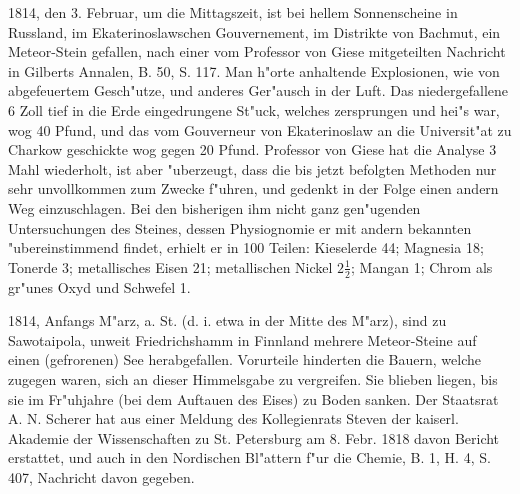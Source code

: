 \documentclass[a4paper, 11pt, oneside, polutonikogreek, german]{article}
\begin{document}
1814, den 3. Februar, um die Mittagszeit, ist bei hellem Sonnenscheine in Russland, im Ekaterinoslawschen Gouvernement, im Distrikte von Bachmut, ein Meteor-Stein gefallen, nach einer vom Professor von Giese mitgeteilten Nachricht in Gilberts Annalen, B. 50, S. 117. Man h"orte anhaltende Explosionen, wie von abgefeuertem Gesch"utze, und anderes Ger"ausch in der Luft. Das niedergefallene 6 Zoll tief in die Erde eingedrungene St"uck, welches zersprungen und hei"s war, wog 40 Pfund, und das vom Gouverneur von Ekaterinoslaw an die Universit"at zu Charkow geschickte wog gegen 20 Pfund. Professor von Giese hat die Analyse 3 Mahl wiederholt, ist aber "uberzeugt, dass die bis jetzt befolgten Methoden nur sehr unvollkommen zum Zwecke f"uhren, und gedenkt in der Folge einen andern Weg einzuschlagen. Bei den bisherigen ihm nicht ganz gen"ugenden Untersuchungen des Steines, dessen Physiognomie er mit andern bekannten "ubereinstimmend findet, erhielt er in 100 Teilen: Kieselerde 44; Magnesia 18; Tonerde 3; metallisches Eisen 21; metallischen Nickel $\mathfrak{2\frac{1}{2}}$; Mangan 1; Chrom als gr"unes Oxyd und Schwefel 1.

1814, Anfangs M"arz, a. St. (d. i. etwa in der Mitte des M"arz), sind zu Sawotaipola, unweit Friedrichshamm in Finnland mehrere Meteor-Steine auf einen (gefrorenen) See herabgefallen. Vorurteile hinderten die Bauern, welche zugegen waren, sich an dieser Himmelsgabe zu vergreifen. Sie blieben liegen, bis sie im Fr"uhjahre (bei dem Auftauen des Eises) zu Boden sanken. Der Staatsrat A. N. Scherer hat aus einer Meldung des Kollegienrats Steven der kaiserl. Akademie der Wissenschaften zu St. Petersburg am 8. Febr. 1818 davon Bericht erstattet, und auch in den Nordischen Bl"attern f"ur die Chemie, B. 1, H. 4, S. 407, Nachricht davon gegeben.
\end{document}
